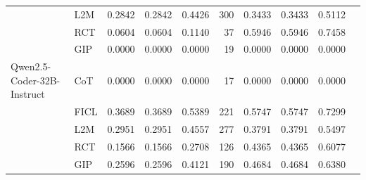 \documentclass[conference]{IEEEtran}
\begin{document}
\begin{longtable}{p{3.5cm} l r r r r r r r r}
                            & L2M  & 0.2842 & 0.2842 & 0.4426 & 300 & 0.3433 & 0.3433 & 0.5112 \\
                            & RCT  & 0.0604 & 0.0604 & 0.1140 & 37  & 0.5946 & 0.5946 & 0.7458 \\
                            & GIP  & 0.0000 & 0.0000 & 0.0000 & 19  & 0.0000 & 0.0000 & 0.0000 \\
Qwen2.5-Coder-32B-Instruct  & CoT  & 0.0000 & 0.0000 & 0.0000 & 17  & 0.0000 & 0.0000 & 0.0000 \\
                            & FICL & 0.3689 & 0.3689 & 0.5389 & 221 & 0.5747 & 0.5747 & 0.7299 \\
                            & L2M  & 0.2951 & 0.2951 & 0.4557 & 277 & 0.3791 & 0.3791 & 0.5497 \\
                            & RCT  & 0.1566 & 0.1566 & 0.2708 & 126 & 0.4365 & 0.4365 & 0.6077 \\
                            & GIP  & 0.2596 & 0.2596 & 0.4121 & 190 & 0.4684 & 0.4684 & 0.6380 \\



  \bottomrule

\end{longtable}
\end{document}
